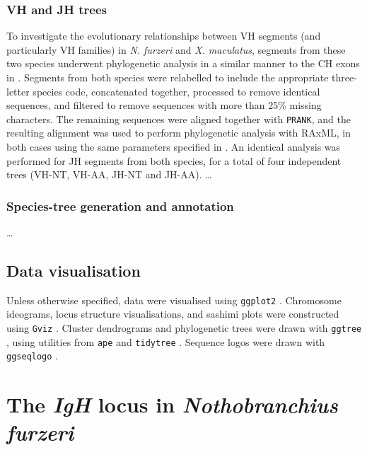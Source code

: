 \subsubsection{VH and JH trees}

To investigate the evolutionary relationships between VH segments (and particularly VH families) in \textit{N. furzeri} and \textit{X. maculatus}, segments from these two species underwent phylogenetic analysis in a similar manner to the CH exons in . Segments from both species were relabelled to include the appropriate three-letter species code, concatenated together, processed to remove identical sequences, and filtered to remove sequences with more than 25\% missing characters. The remaining sequences were aligned together with \lstinline{PRANK}, and the resulting alignment was used to perform phylogenetic analysis with RAxML, in both cases using the same parameters specified in . An identical analysis was performed for JH segments from both species, for a total of four independent trees (VH-NT, VH-AA, JH-NT and JH-AA). \dots %

\subsubsection{Species-tree generation and annotation}

\dots

\subsection{Data visualisation}

Unless otherwise specified, data were visualised using \lstinline[language=R]{ggplot2} \citep{wickham2016ggplot2}. Chromosome ideograms, locus structure visualisations, and sashimi plots were constructed using \lstinline[language=R]{Gviz} \citep{hahne2016gviz}. Cluster dendrograms and phylogenetic trees were drawn with \lstinline[language=R]{ggtree} \citep{guangchuang2018ggtree}, using utilities from \lstinline[language=R]{ape} \citep{paradis2018ape} and \lstinline[language=R]{tidytree} \citep{guangchuang2018tidytree}. Sequence logos were drawn with \lstinline[language=R]{ggseqlogo} \citep{wagih2017ggseqlogo}. 

\section{The \textit{IgH} locus in \textit{Nothobranchius furzeri}}
\label{sec:nfu-locus}


